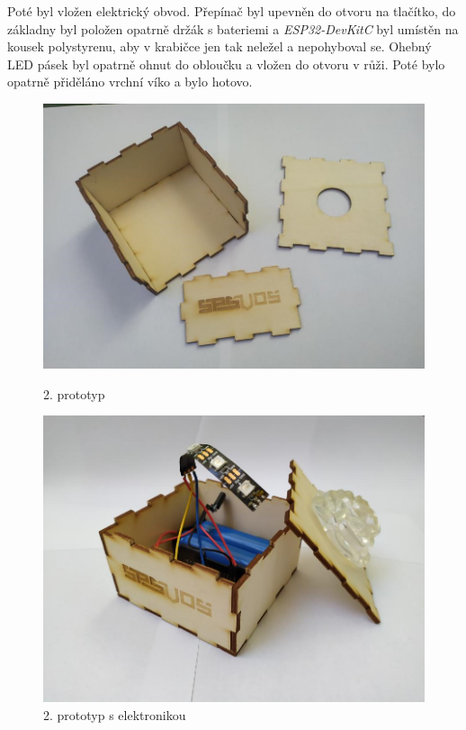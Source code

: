 Poté byl vložen elektrický obvod. Přepínač byl upevněn do otvoru na tlačítko, do základny byl položen opatrně držák s bateriemi a \textit{ESP32-DevKitC} byl umístěn na kousek polystyrenu, aby v krabičce jen tak neležel a nepohyboval se. 
Ohebný LED pásek byl opatrně ohnut do obloučku a vložen do otvoru v růži. Poté bylo opatrně přiděláno vrchní víko a bylo hotovo. 


\begin{figure}[htbp]
	\centering
	\begin{minipage}[b]{0.45\textwidth}
		\centering
		\includegraphics[width=1.1\textwidth]{img/06zakl/Box.jpg}
		\caption{2. prototyp}
	\end{minipage}
	\qquad
	\begin{minipage}[b]{0.45\textwidth}
		\centering
		\includegraphics[width=1.01\textwidth]{img/06zakl/2prototypele2.jpg}
		\caption{2. prototyp s elektronikou}
	\end{minipage}
\end{figure}


\newpage
